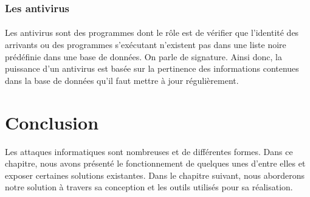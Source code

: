     \subsubsection{Les antivirus}
      \paragraph{}
	Les antivirus sont des programmes dont le rôle est de vérifier que  l’identité des arrivants ou des programmes s’exécutant n’existent pas dans une liste noire prédéfinie dans une base de données. On parle de signature. Ainsi donc, la puissance d'un antivirus est basée sur la pertinence des informations contenues dans la base de données qu'il faut mettre à jour régulièrement. 
		 
		  
\section*{Conclusion}
  Les attaques informatiques sont nombreuses et de différentes formes. Dans ce chapitre, nous avons présenté le fonctionnement de quelques unes d'entre elles et exposer certaines solutions existantes. Dans le chapitre suivant, nous aborderons notre solution à travers sa conception et les outils utilisés pour sa réalisation.